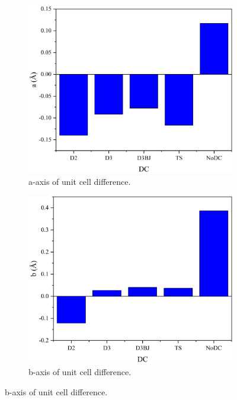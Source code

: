 \begin{figure}[!htb]
\centering

\begin{subfigure}{0.49\textwidth}
\centering
\includegraphics[width=\textwidth]{Figures/Analysis/IVDW/achnagebar.png}
\caption{a-axis of unit cell difference.}
\label{fig:StructAnal_D2}
\end{subfigure}
\begin{subfigure}{0.49\textwidth}
\centering
\includegraphics[width=\textwidth]{Figures/Analysis/IVDW/bchangebar.png}
\caption{b-axis of unit cell difference.}
\label{fig:StructAnal_D3}
\end{subfigure}


\end{figure}
